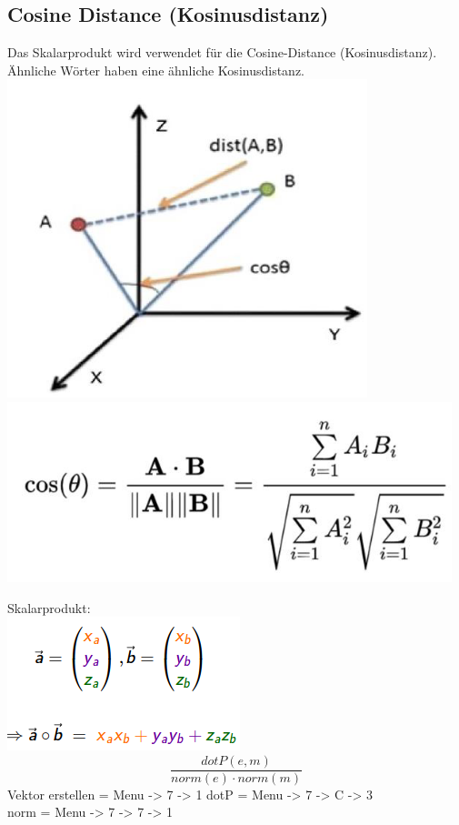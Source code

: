 \subsection{Cosine Distance (Kosinusdistanz)}
Das Skalarprodukt wird verwendet für die Cosine-Distance (Kosinusdistanz). Ähnliche Wörter haben eine ähnliche Kosinusdistanz.
\includegraphics[width=\linewidth]{img/cosine_distance1.png}
\includegraphics[width=\linewidth]{img/cosine_distance2.png}

\textcolor{myblue}{Skalarprodukt:}\\
\includegraphics[width=\linewidth]{img/skalarprodukt.png}
$$\frac{dotP\left(e,m\right)}{norm\left(e\right)\cdot norm\left(m\right)}$$
Vektor erstellen = Menu -> 7 -> 1
dotP = Menu -> 7 -> C -> 3\\
norm = Menu -> 7 -> 7 -> 1\\

